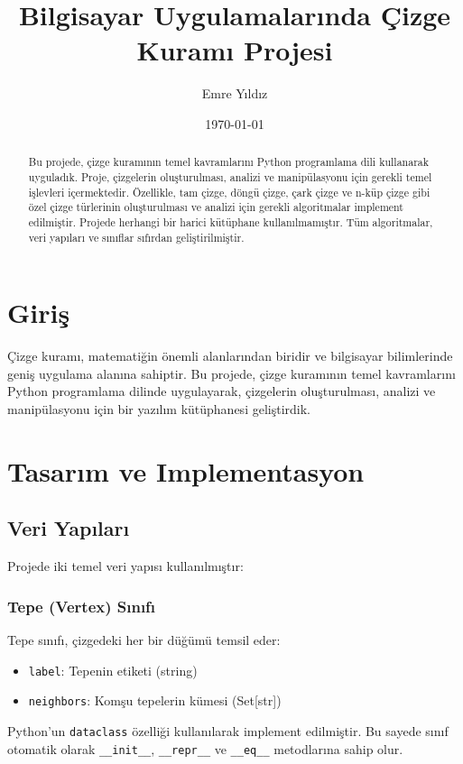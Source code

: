 \documentclass[12pt]{article}
\title{Bilgisayar Uygulamalarında Çizge Kuramı Projesi}
\author{Emre Yıldız}
\date{\today}
\begin{document}
\maketitle

\begin{abstract}
Bu projede, çizge kuramının temel kavramlarını Python programlama dili kullanarak uyguladık. Proje, çizgelerin oluşturulması, analizi ve manipülasyonu için gerekli temel işlevleri içermektedir. Özellikle, tam çizge, döngü çizge, çark çizge ve n-küp çizge gibi özel çizge türlerinin oluşturulması ve analizi için gerekli algoritmalar implement edilmiştir. Projede herhangi bir harici kütüphane kullanılmamıştır. Tüm algoritmalar, veri yapıları ve sınıflar sıfırdan geliştirilmiştir.
\end{abstract}

\tableofcontents

\section{Giriş}
Çizge kuramı, matematiğin önemli alanlarından biridir ve bilgisayar bilimlerinde geniş uygulama alanına sahiptir. Bu projede, çizge kuramının temel kavramlarını Python programlama dilinde uygulayarak, çizgelerin oluşturulması, analizi ve manipülasyonu için bir yazılım kütüphanesi geliştirdik.

\section{Tasarım ve Implementasyon}

\subsection{Veri Yapıları}
Projede iki temel veri yapısı kullanılmıştır:

\subsubsection{Tepe (Vertex) Sınıfı}
Tepe sınıfı, çizgedeki her bir düğümü temsil eder:
\begin{itemize}
    \item \texttt{label}: Tepenin etiketi (string)
    \item \texttt{neighbors}: Komşu tepelerin kümesi (Set[str])
\end{itemize}

Python'un \texttt{dataclass} özelliği kullanılarak implement edilmiştir. Bu sayede sınıf otomatik olarak \texttt{\_\_init\_\_}, \texttt{\_\_repr\_\_} ve \texttt{\_\_eq\_\_} metodlarına sahip olur.
\end{document}
